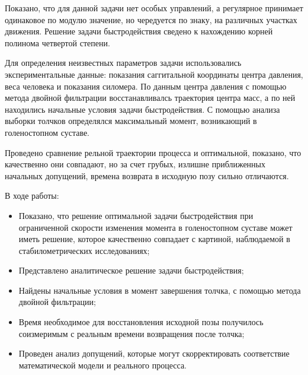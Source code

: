 \documentclass[a4paper,12pt, openany]{book}
\theoremstyle{plain} %
\theoremstyle{definition} %
\theoremstyle{remark} %
\numberwithin{equation}{chapter}
\begin{document}
{Показано, что для данной задачи нет особых управлений, а регулярное принимает одинаковое по модулю значение, но чередуется по знаку, на различных участках движения. Решение задачи быстродействия сведено к нахождению корней полинома четвертой степени.

Для определения неизвестных параметров задачи использовались экспериментальные данные: показания саггитальной координаты центра давления, веса человека и показания силомера.
По данным центра давления с помощью метода двойной фильтрации восстанавливалсь траектория центра масс, а по ней находились начальные условия задачи быстродействия.
 С помощью анализа выборки толчков определялся максимальный момент, возникающий в голеностопном суставе.

Проведено сравнение рельной траектории процесса и оптимальной, показано, что качественно они совпадают, но за счет грубых, излишне приближенных начальных допущений, времена возврата в исходную позу сильно отличаются.


В ходе работы:
\begin{itemize}
    \item Показано, что решение оптимальной задачи быстродействия при ограниченной
          скорости изменения момента в голеностопном суставе может иметь решение, которое качественно совпадает с картиной, наблюдаемой в стабилометрических исследованиях;
    \item Представлено аналитическое решение задачи быстродействия;
    \item Найдены начальные условия в момент завершения толчка, с помощью метода двойной фильтрации;
    \item Время необходимое для восстановления исходной позы получилось
          соизмеримым с реальным времени возвращения после толчка;
    \item Проведен анализ допущений, которые могут скорректировать соответствие математической модели и реального процесса.
\end{itemize}





\newpage


}
\end{document}
